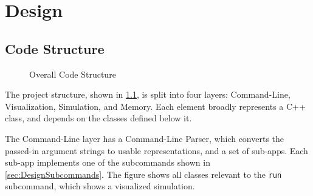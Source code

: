 
\chapter{Design}
\label{sec:Design} 

\section{Code Structure}
\begin{figure}
    \centering
    \caption{Overall Code Structure}
    \label{fig:designstructure}
\end{figure}
The project structure, shown in \cref{fig:designstructure}, is split into four layers: Command-Line, Visualization, Simulation, and Memory.
Each element broadly represents a C++ class, and depends on the classes defined below it.

The Command-Line layer has a Command-Line Parser, which converts the passed-in argument strings to usable representations, and a set of sub-apps.
Each sub-app implements one of the subcommands shown in \cref{sec:DesignSubcommands}.
The figure shows all classes relevant to the \texttt{run} subcommand, which shows a visualized simulation.

